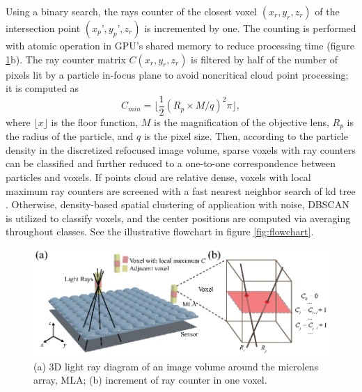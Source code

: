 \documentclass[draftthesis,fullpage]{uiucthesis}
\begin{document}
Using a binary search, the rays counter of the closest voxel $(x_r,y_r,z_r)$ of the intersection point $(x_p’, y_p’, z_r)$ is incremented by one. The counting is performed with atomic operation in GPU's shared memory to reduce processing time  (figure \ref{fig:ray_counter}b). The ray counter matrix $C(x_r,y_r,z_r)$ is filtered by half of the number of pixels lit by a particle in-focus plane to avoid noncritical cloud point processing; it is computed as
\begin{equation}
    C_{min} =  \lfloor \frac{1}{2}(R_p \times M / q)^2 \pi \rfloor,
  \label{eq:RayCounterThreshold}
\end{equation}
where $\lfloor x \rfloor$ is the floor function,  $M$ is the magnification of the objective lens, $R_p$ is the radius of the particle, and $q$ is the pixel size. Then, according to the particle density in the discretized refocused image volume, sparse voxels with ray counters can be classified and further reduced to a one-to-one correspondence between particles and voxels. If points cloud are relative dense, voxels with local maximum ray counters are screened with a fast nearest neighbor search of kd tree \citep{ramasubramanian1989generalized}. Otherwise, density-based spatial clustering of application with noise, DBSCAN \citep{ester1996density} is utilized to classify voxels, and the center positions are computed via averaging throughout classes. See the illustrative flowchart in figure \ref{fig:flowchart}.

\begin{figure}[h]
       \centerline{\includegraphics[width=0.7\linewidth]{fig/figure2.eps}} 
       \caption{(a) 3D light ray diagram of an image volume around the microlens array, MLA; (b) increment of ray counter in one voxel.}
       \label{fig:ray_counter}
\end{figure}
       
\end{document}
